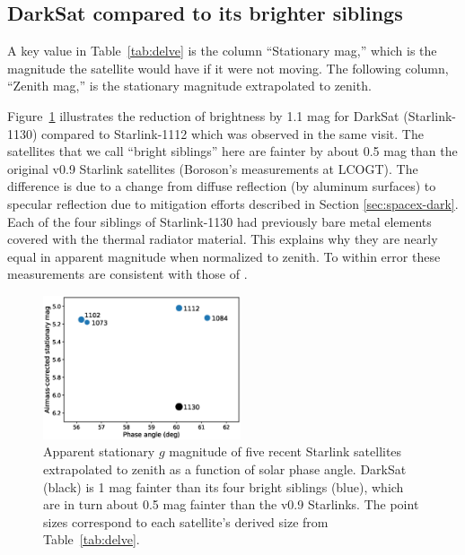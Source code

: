 \documentclass[twocolumn,trackchanges]{aastex63}
\begin{document}



\subsection{DarkSat compared to its brighter siblings}
\label{subsec:darksat-compare}

A key value in Table~\ref{tab:delve} is the column ``Stationary mag,'' which is the magnitude the satellite would have if it were not moving. The following column, ``Zenith mag,'' is the stationary magnitude extrapolated to zenith.

Figure~\ref{fig:5sats} illustrates the reduction of brightness by 1.1 mag for DarkSat (Starlink-1130) compared to Starlink-1112 which was observed in the same visit. The satellites that we call ``bright siblings'' here are fainter by about 0.5 mag than the original v0.9 Starlink satellites (Boroson's measurements at LCOGT).
The difference is due to a change from diffuse reflection (by aluminum surfaces) to specular reflection due to mitigation efforts described in Section \ref{sec:spacex-dark}. Each of the four siblings of Starlink-1130 had previously bare metal elements covered with the thermal radiator material. This explains why they are nearly equal in apparent magnitude when normalized to zenith. To within error these measurements are consistent with those of \citet{2020A&A...637L...1T}.

\begin{figure}[ht]
\includegraphics[trim=+1cm 0 0 0, width=0.52\textwidth]{phase-angle-vs-mag.eps}
\caption{Apparent stationary $g$ magnitude of five recent Starlink satellites extrapolated to zenith as a function of solar phase angle. DarkSat (black) is 1 mag fainter than its four bright siblings (blue), which are in turn about 0.5 mag fainter than the v0.9 Starlinks. The point sizes correspond to each satellite's derived size from Table~\ref{tab:delve}. \label{fig:5sats}}
\end{figure}
\end{document}
